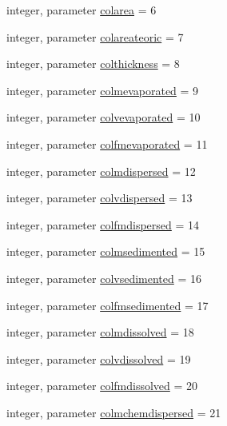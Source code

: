 \begin{DoxyCompactItemize}
\item 
integer, parameter \mbox{\hyperlink{namespacemoduleoil__0d_a89442890dd53f90c6af5c8a26b889094}{colarea}} = 6
\item 
integer, parameter \mbox{\hyperlink{namespacemoduleoil__0d_a56d9cfb8b48bd36fa33bd400ec99a285}{colareateoric}} = 7
\item 
integer, parameter \mbox{\hyperlink{namespacemoduleoil__0d_ac9241372e9a6c314354df1be11c845a0}{colthickness}} = 8
\item 
integer, parameter \mbox{\hyperlink{namespacemoduleoil__0d_a57ec2a70d2b008984a4689b8aa529ceb}{colmevaporated}} = 9
\item 
integer, parameter \mbox{\hyperlink{namespacemoduleoil__0d_a71576d5d09ccfb4a02110fe478b30e6a}{colvevaporated}} = 10
\item 
integer, parameter \mbox{\hyperlink{namespacemoduleoil__0d_a1d23e12f7d30e98ee069d56753f1baff}{colfmevaporated}} = 11
\item 
integer, parameter \mbox{\hyperlink{namespacemoduleoil__0d_a040cd3f93ec55bab011ced375ccbecd0}{colmdispersed}} = 12
\item 
integer, parameter \mbox{\hyperlink{namespacemoduleoil__0d_a8e81392cc9310753c1ec679a479eaab2}{colvdispersed}} = 13
\item 
integer, parameter \mbox{\hyperlink{namespacemoduleoil__0d_a12e7175fbde33d7ea29f4e119fffa797}{colfmdispersed}} = 14
\item 
integer, parameter \mbox{\hyperlink{namespacemoduleoil__0d_a34a93f10c4faaccb7a2f38b2ff7a40b1}{colmsedimented}} = 15
\item 
integer, parameter \mbox{\hyperlink{namespacemoduleoil__0d_abb7a1f5cc43537d0a980d6cf97d03dba}{colvsedimented}} = 16
\item 
integer, parameter \mbox{\hyperlink{namespacemoduleoil__0d_a46001cfe6074a6d45e98b7d7b0f7c28f}{colfmsedimented}} = 17
\item 
integer, parameter \mbox{\hyperlink{namespacemoduleoil__0d_a6251e1255d8b28af10a0e17065f99554}{colmdissolved}} = 18
\item 
integer, parameter \mbox{\hyperlink{namespacemoduleoil__0d_aa3385ce40df10f7199f0aa7da8ee08fa}{colvdissolved}} = 19
\item 
integer, parameter \mbox{\hyperlink{namespacemoduleoil__0d_aa98b02cf8b1ea70db35db2f282bac356}{colfmdissolved}} = 20
\item 
integer, parameter \mbox{\hyperlink{namespacemoduleoil__0d_a46bac6314b70090798aab8e9b1c3e298}{colmchemdispersed}} = 21
\item 

\end{DoxyCompactItemize}
